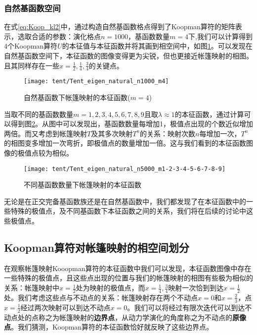 \subsubsection{自然基函数空间}
在式\eqref{eq:Koop_kl2}中，通过构造自然基函数格点得到了Koopman算符的矩阵表示，选取合适的参数：演化格点$n=1000$，基函数数量$m=4$下,我们可以计算得到4个Koopman算符$U$的本征值与本征函数并将其画到相空间中，如图\ref{fig:Tent_eigen_natural_n1000_m4}。可以发现在自然基函数空间下，本征函数的图像变得更为尖锐，但也更接近帐篷映射的相图。且其同样存在一些$x=\frac{1}{2},\frac{1}{4},\frac{3}{4}$的关键点。
\begin{figure}[!]
	\centering
	\texttt{[image: tent/Tent\_eigen\_natural\_n1000\_m4]}
    \caption{自然基函数下帐篷映射的本征函数($m=4$)}\label{fig:Tent_eigen_natural_n1000_m4}
\end{figure}

当取不同的基函数数量$m=1,2,3,4,5,6,7,8,9$且取$\lambda\approx 1$的本征函数，通过计算可以得到图\ref{Tent_eigen_natural_n5000_m1-2-3-4-5-6-7-8-9}。从图中可以发现出，基函数数量每增加1，极值点出现的个数近似增加两倍。而又考虑到帐篷映射$T$及其多次映射$T^n$的关系：映射次数$n$每增加一次，$T^n$的相图变多增加一次弯折，即极值点的数量增加一倍。这与我们看到的本征函数图像的极值点较为相似。

\begin{figure}[!]
	\centering
	\texttt{[image: tent/Tent\_eigen\_natural\_n5000\_m1-2-3-4-5-6-7-8-9]}
    \caption{不同基函数数量下帐篷映射的本征函数}\label{Tent_eigen_natural_n5000_m1-2-3-4-5-6-7-8-9}
\end{figure}

无论是在正交完备基函数族还是在自然基函数中，我们都发现了在本征函数中的一些特殊的极值点，及不同基函数下本征函数之间的关系，我们将在后续的讨论中这些极值点。

\subsection{Koopman算符对帐篷映射的相空间划分}
在观察帐篷映射Kooopman算符的本征函数中我们可以发现，本征函数图像中存在一些特殊的极值点，且这些点出现的位置与我们的帐篷映射的相图有些极为相似的关系：帐篷映射中$x=\frac{1}{2}$处为映射的极值点，而$x=\frac{1}{4},\frac{3}{4}$映射一次恰到到达$x=\frac{1}{2}$处。我们考虑这些点与不动点的关系：帐篷映射存在两个不动点$x=0$和$x=\frac{2}{3}$，点$x=\frac{1}{2}$经过两次映射可以到达不动点$x=0$。我们可以将经过有限次迭代可以到达不动点处的点称之为帐篷映射的\textbf{边界点}，从动力学演化的角度称之为不动点的\textbf{原像点}。我们猜测，Koopman算符的本征函数恰好就反映了这些边界点。

